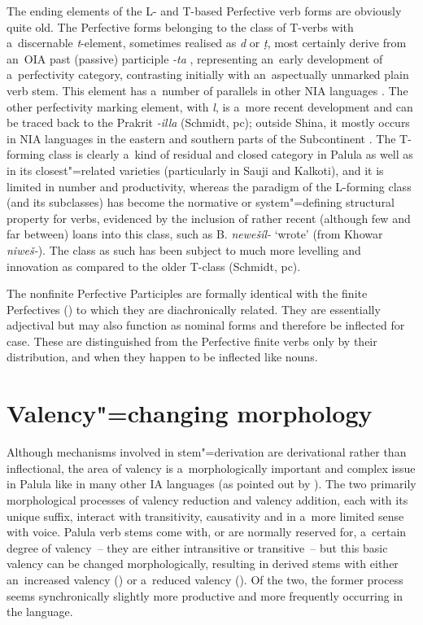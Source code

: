 The ending elements of the L- and T-based Perfective verb forms are obviously quite old. The Perfective forms belonging to the class of T-verbs with a~discernable \textit{t}-element, sometimes realised as \textit{d} or \textit{ṭ}, most certainly derive from an~OIA past (passive) participle \textit{-ta} \citep[952]{whitney1960}, representing an~early development of a~perfectivity category, contrasting initially with an~aspectually unmarked plain verb stem. This element has a~number of parallels in other NIA languages \citep[269, 272]{masica1991}. The other perfectivity marking element, with \textit{l}, is a~more recent development and can be traced back to the Prakrit \textit{-illa} (Schmidt, pc); outside Shina, it mostly occurs in NIA languages in the eastern and southern parts of the Subcontinent \citep[270]{masica1991}. The T-forming class is clearly a~kind of residual and closed category in Palula as well as in its closest"=related varieties (particularly in Sauji and Kalkoti), and it is limited in number and productivity, whereas the paradigm of the L-forming class (and its subclasses) has become the normative or system"=defining structural property \citep[104]{mcmahon1994} for verbs, evidenced by the inclusion of rather recent (although few and far between) loans into this class, such as B. \textit{newešíl-} `wrote' (from Khowar \textit{niweš-}). The class as such has been subject to much more levelling and innovation as compared to the older T-class (Schmidt, pc).


 The nonfinite Perfective Participles are formally identical with
the finite Perfectives () to which they are diachronically related. They are
essentially adjectival but may also function as nominal forms and therefore be inflected for
case. These are distinguished from the Perfective finite verbs only by their distribution, and when
they happen to be inflected like nouns.


\section{Valency"=changing morphology}
\label{sec:8-5}

Although mechanisms involved in stem"=derivation are derivational rather than inflectional, the area of valency is a~morphologically important and complex issue in Palula like in many other IA languages (as pointed out by \citealt[315]{masica1991}). The two primarily morphological processes of valency reduction and valency addition, each with its unique suffix, interact with transitivity, causativity and in a~more limited sense with voice. Palula verb stems come with, or are normally reserved for, a~certain degree of valency~-- they are either intransitive or transitive~-- but this basic valency can be changed morphologically, resulting in derived stems with either an~increased valency () or a~reduced valency (). Of the two, the former process seems synchronically slightly more productive and more frequently occurring in the language.



